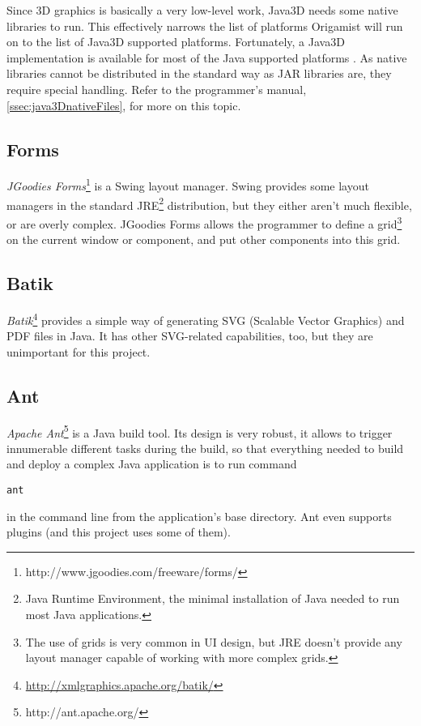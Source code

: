 Since 3D graphics is basically a very low-level work, Java3D needs some native
libraries to run. This effectively narrows the list of platforms Origamist will run on to the list of Java3D supported platforms. Fortunately, a Java3D implementation is available for most of the Java supported platforms \cite{java3dplatforms}. As native libraries cannot be distributed in the standard way as JAR libraries are, they require special handling. Refer to the programmer's manual, \ref{ssec:java3DnativeFiles}, for more on this topic.

\subsection{Forms}
\emph{JGoodies Forms}\footnote{http://www.jgoodies.com/freeware/forms/} is a Swing layout manager. Swing provides some layout managers in the standard JRE\footnote{Java Runtime Environment, the minimal installation of Java needed to run most Java applications.} distribution, but they either aren't much flexible, or are overly complex. JGoodies Forms allows the programmer to define a grid\footnote{The use of grids is very common in UI design, but JRE doesn't provide any layout manager capable of working with more complex grids.} on
the current window or component, and put other components into this grid.

\subsection{Batik}
\emph{Batik}\footnote{\url{http://xmlgraphics.apache.org/batik/}} provides a simple way of generating SVG (Scalable Vector Graphics) and PDF files in Java. It has other SVG-related capabilities, too, but they are unimportant for this project.

\subsection{Ant}
\emph{Apache Ant}\footnote{http://ant.apache.org/} is a Java build tool. Its design is very robust, it allows to trigger innumerable different tasks during the build, so that everything needed to build and deploy a complex Java application is to run command
\begin{verbatim}
ant
\end{verbatim}
in the command line from the application's base directory. Ant even supports
plugins (and this project uses some of them).

